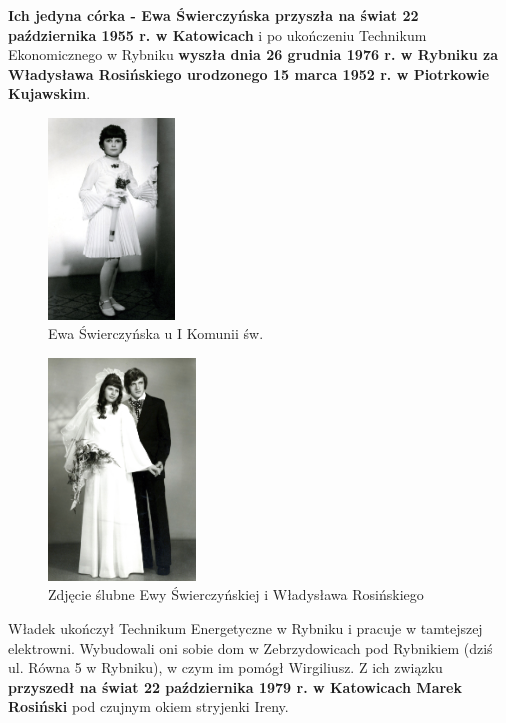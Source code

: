 \textbf{Ich jedyna córka - Ewa Świerczyńska przyszła na świat 22 października 1955 r. w Katowicach} i po ukończeniu Technikum Ekonomicznego w Rybniku \textbf{wyszła dnia 26 grudnia 1976 r. w Rybniku za Władysława Rosińskiego urodzonego 15 marca 1952 r. w Piotrkowie Kujawskim}.

\begin{figure}[!h]
\begin{center}
\includegraphics[width=0.3\textwidth]{photo/ewa_swierczynska.jpg}
\caption{Ewa Świerczyńska u I Komunii św.}
\label{rys:ewa_swierczynska}
\end{center}
\end{figure}

\begin{figure}[!h]
\begin{center}
\includegraphics[width=0.35\textwidth]{photo/ewa_wladyslaw_rosinscy_slub}
\caption{Zdjęcie ślubne Ewy Świerczyńskiej i Władysława Rosińskiego}
\label{rys:ewa_wladyslaw_rosinscy_slub}
\end{center}
\end{figure}

Władek ukończył Technikum Energetyczne w Rybniku i pracuje w tamtejszej elektrowni. Wybudowali oni sobie dom w Zebrzydowicach pod Rybnikiem (dziś ul. Równa 5 w Rybniku), w czym im pomógł Wirgiliusz. Z ich związku \textbf{przyszedł na świat 22 października 1979 r. w Katowicach Marek Rosiński} pod czujnym okiem stryjenki Ireny.

